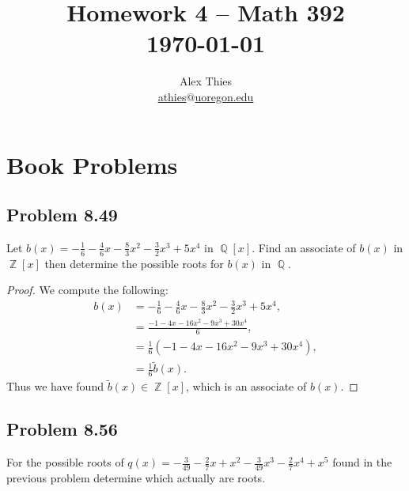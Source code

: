 \documentclass[letterpaper, 12pt]{amsart}
\DeclareMathOperator{\Z}{\mathbb{Z}}
\DeclareMathOperator{\Q}{\mathbb{Q}}
\begin{document}
	\title{Homework 4  -- Math 392 \\ \today}
	\author{Alex Thies \\ \href{mailto:athies@uoregon.edu}{\lowercase{athies$@$uoregon.edu}}}

	\maketitle

	\section{Book Problems}
	\label{sec:book_problems}
		\subsection*{Problem 8.49}
		\label{sub:problem_8_49}
		Let $b(x) = -\frac{1}{6}  - \frac{4}{6}x - \frac{8}{3}x^{2} - \frac{3}{2}x^{3} + 5x^{4}$ in $\Q[x]$.
		Find an associate of $b(x)$ in $\Z[x]$ then determine the possible roots for $b(x)$ in $\Q$.

		\begin{proof}
		We compute the following:
			\begin{align*}
			b(x) &= -\frac{1}{6}  - \frac{4}{6}x - \frac{8}{3}x^{2} - \frac{3}{2}x^{3} + 5x^{4}, \\
			&= \frac{-1 - 4x - 16x^{2} - 9x^{3} + 30x^{4}}{6}, \\
			&= \frac{1}{6}\left( -1 - 4x - 16x^{2} - 9x^{3} + 30x^{4} \right), \\
			&= \frac{1}{6} \tilde{b}(x).
			\end{align*}
		Thus we have found $\tilde{b}(x) \in \Z[x]$, which is an associate of $b(x)$.
		\end{proof}

		\subsection*{Problem 8.56}
		\label{sub:problem_8_56}
		For the possible roots of $q(x) = -\frac{3}{49} - \frac{2}{7}x + x^{2} - \frac{3}{49}x^{3} - \frac{2}{7}x^{4} + x^{5}$ found in the previous problem determine which actually are roots.
\end{document}
